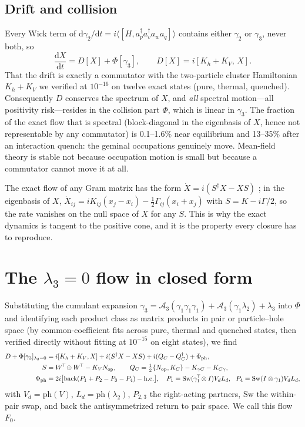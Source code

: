 \documentclass[aip,jcp,reprint,floatfix,superscriptaddress]{revtex4-2}
\newcommand{\dd}{\mathrm{d}}
\newcommand{\ad}{a^\dagger}
\begin{document}
\subsection{Drift and collision}
Every Wick term of $\dd\gamma_2/\dd t=i\langle[H,\ad_p\ad_v a_w a_q]\rangle$ contains either $\gamma_2$ or $\gamma_3$, never both, so
\begin{equation}
\frac{\dd X}{\dd t}=D[X]+\Phi[\gamma_3],\qquad D[X]=i[K_h+K_V,\,X].
\label{eq:split}
\end{equation}
That the drift is exactly a commutator with the two-particle cluster Hamiltonian $K_h+K_V$ we verified at $10^{-16}$ on twelve exact states (pure, thermal, quenched). Consequently $D$ conserves the spectrum of $X$, and \emph{all} spectral motion---all positivity risk---resides in the collision part $\Phi$, which is linear in $\gamma_3$. The fraction of the exact flow that is spectral (block-diagonal in the eigenbasis of $X$, hence not representable by any commutator) is 0.1--1.6\% near equilibrium and 13--35\% after an interaction quench: the geminal occupations genuinely move. Mean-field theory is stable not because occupation motion is small but because a commutator cannot move it at all.

The exact flow of any Gram matrix has the form $\dot X=i(S^\dagger X-XS)$ \cite{xr}; in the eigenbasis of $X$, $\dot X_{ij}=iK_{ij}(x_j-x_i)-\tfrac12\Gamma_{ij}(x_i+x_j)$ with $S=K-i\Gamma/2$, so the rate vanishes on the null space of $X$ for any $S$. This is why the exact dynamics is tangent to the positive cone, and it is the property every closure has to reproduce.

\section{The $\lambda_3=0$ flow in closed form}\label{sec:f0}
Substituting the cumulant expansion $\gamma_3=\mathcal A_3(\gamma_1\gamma_1\gamma_1)+\mathcal A_3(\gamma_1\lambda_2)+\lambda_3$ into $\Phi$ and identifying each product class as matrix products in pair or particle--hole space (by common-coefficient fits across pure, thermal and quenched states, then verified directly without fitting at $10^{-15}$ on eight states), we find
\begin{align}
D+\Phi[\gamma_3]_{\lambda_3=0}&=i[K_h+K_V,X]+i(S^\dagger X-XS)+i(Q_C-Q_C^\dagger)+\Phi_{\rm ph},\label{eq:F0}\\
S&=W^{\!\top}\!\oplus W^{\!\top}-K_V N_{\rm op},\qquad
Q_C=\tfrac12\{N_{\rm op},K_C\}-K_{\gamma C}-K_{C\gamma},\nonumber\\
\Phi_{\rm ph}&=2i\big[\mathrm{back}(P_1+P_2-P_3-P_4)-{\rm h.c.}\big],\quad
P_1=\mathrm{Sw}(\gamma_1^{\!\top}\!\otimes I)V_d L_d,\ \ P_4=\mathrm{Sw}(I\otimes\gamma_1)V_dL_d,\nonumber
\end{align}
with $V_d=\mathrm{ph}(V)$, $L_d=\mathrm{ph}(\lambda_2)$, $P_{2,3}$ the right-acting partners, $\mathrm{Sw}$ the within-pair swap, and $\mathrm{back}$ the antisymmetrized return to pair space. We call this flow $F_0$.
\end{document}
